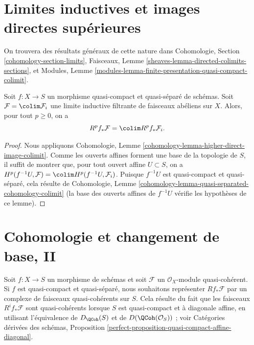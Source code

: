 \section{Limites inductives et images directes supérieures}
\label{section-colimits}

\noindent
On trouvera des résultats généraux de cette nature dans Cohomologie, Section
\ref{cohomology-section-limits}, Faisceaux, Lemme
\ref{sheaves-lemma-directed-colimits-sections}, et Modules, Lemme
\ref{modules-lemma-finite-presentation-quasi-compact-colimit}.

\begin{lemma}
\label{lemma-colimit-cohomology}
Soit $f : X \to S$ un morphisme quasi-compact et quasi-séparé de schémas.
Soit $\mathcal{F} = \colim \mathcal{F}_i$ une limite inductive filtrante de
faisceaux abéliens sur $X$. Alors, pour tout $p \geq 0$, on a
$$
R^pf_*\mathcal{F} = \colim R^pf_*\mathcal{F}_i.
$$
\end{lemma}

\begin{proof}
Nous appliquons Cohomologie, Lemme
\ref{cohomology-lemma-higher-direct-image-colimit}. Comme les ouverts affines
forment une base de la topologie de $S$, il suffit de montrer que, pour tout
ouvert affine $U \subset S$, on a
$H^p(f^{-1}U, \mathcal{F}) = \colim H^p(f^{-1}U, \mathcal{F}_i)$. Puisque
$f^{-1}U$ est quasi-compact et quasi-séparé, cela résulte de Cohomologie,
Lemme \ref{cohomology-lemma-quasi-separated-cohomology-colimit} (la base des
ouverts affines de $f^{-1}U$ vérifie les hypothèses de ce lemme).
\end{proof}










\section{Cohomologie et changement de base, II}
\label{section-cohomology-and-base-change-derived}

\noindent
Soit $f : X \to S$ un morphisme de schémas et soit $\mathcal{F}$ un
$\mathcal{O}_X$-module quasi-cohérent. Si $f$ est quasi-compact et
quasi-séparé, nous souhaitons représenter $Rf_*\mathcal{F}$ par un complexe de
faisceaux quasi-cohérents sur $S$. Cela résulte du fait que les faisceaux
$R^if_*\mathcal{F}$ sont quasi-cohérents lorsque $S$ est quasi-compact et à
diagonale affine, en utilisant l'équivalence de $D_\QCoh(S)$ et de
$D(\QCoh(\mathcal{O}_S))$ ; voir Catégories dérivées des schémas, Proposition
\ref{perfect-proposition-quasi-compact-affine-diagonal}.

